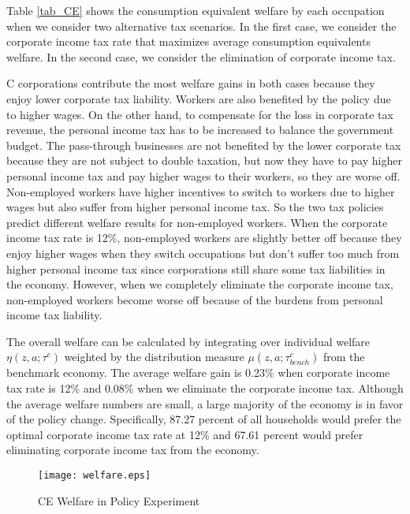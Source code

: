 \documentclass[12pt]{article}
\begin{document}
Table \ref{tab_CE} shows the consumption equivalent welfare by each
occupation when we consider two alternative tax scenarios. In the first case, we consider the corporate income tax rate that maximizes average consumption equivalents welfare. In the second case, we consider the elimination of corporate income tax.
 
C corporations contribute the most welfare gains in both cases because they enjoy lower corporate tax liability. Workers are also benefited by the policy due to higher wages. On the other hand, to compensate for the loss in corporate tax revenue, the personal income tax has to be increased to balance the government budget. The pass-through businesses are not benefited by the lower corporate
tax because they are not subject to double taxation, but now they have to
pay higher personal income tax and pay higher wages to their workers, so
they are worse off. Non-employed workers have higher incentives to switch to workers due to higher wages but also suffer from higher personal income tax. So the two tax policies predict different welfare results for non-employed workers. When the corporate income tax rate is 12\%, non-employed workers are slightly better off because they enjoy higher wages when they switch occupations but don't suffer too much from higher personal income tax since corporations still share some tax liabilities in the economy. However, when we completely eliminate the corporate income tax, non-employed workers become worse off because of the burdens from personal income tax liability. 

The overall welfare can be calculated by integrating over individual welfare 
$\eta(z,a;\tau^c)$ weighted by the distribution measure $\mu(z,a;\tau^c_{bench})$ from the benchmark economy. The average welfare gain is 0.23\% when corporate income tax rate is 12\% and 0.08\% when we eliminate the corporate income tax. Although the average welfare numbers are small, a large majority of the economy is in favor of the policy change. Specifically, 87.27 percent of all households would prefer the optimal corporate income tax rate at 12\% and 67.61 percent would prefer eliminating corporate income tax from the economy.  

\begin{figure}[!ht]
\centering
\caption{\sc CE Welfare in Policy Experiment }
\texttt{[image: welfare.eps]}\label{fig:welfare}
\end{figure}
\end{document}
